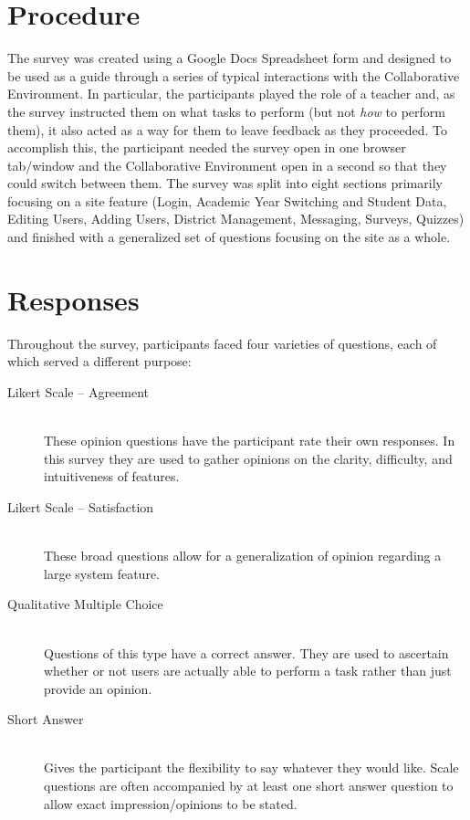 \section{Procedure}
The survey was created using a Google Docs Spreadsheet form and designed to be used as a guide through a series of typical interactions with the Collaborative Environment. In particular, the participants played the role of a teacher and, as the survey instructed them on what tasks to perform (but not \emph{how} to perform them), it also acted as a way for them to leave feedback as they proceeded. To accomplish this, the participant needed the survey open in one browser tab/window and the Collaborative Environment open in a second so that they could switch between them. The survey was split into eight sections primarily focusing on a site feature (Login, Academic Year Switching and Student Data, Editing Users, Adding Users, District Management, Messaging, Surveys, Quizzes) and finished with a generalized set of questions focusing on the site as a whole.

\section{Responses}
Throughout the survey, participants faced four varieties of questions, each of which served a different purpose:

\begin{description}
	\item [Likert Scale -- Agreement] \hfill \\ These opinion questions have the participant rate their own responses. In this survey they are used to gather opinions on the clarity, difficulty, and intuitiveness of features.
	\item [Likert Scale -- Satisfaction] \hfill \\ These broad questions allow for a generalization of opinion regarding a large system feature.
	\item [Qualitative Multiple Choice] \hfill \\ Questions of this type have a correct answer. They are used to ascertain whether or not users are actually able to perform a task rather than just provide an opinion.
	\item [Short Answer] \hfill \\ Gives the participant the flexibility to say whatever they would like. Scale questions are often accompanied by at least one short answer question to allow exact impression/opinions to be stated.
\end{description}

